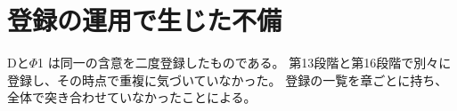 \section{登録の運用で生じた不備}

Dと$\Phi$1 は同一の含意を二度登録したものである。
第13段階と第16段階で別々に登録し、その時点で重複に気づいていなかった。
登録の一覧を章ごとに持ち、全体で突き合わせていなかったことによる。

